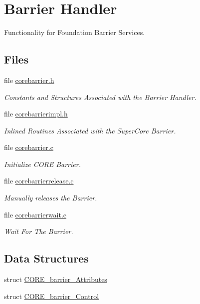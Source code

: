 \hypertarget{group__RTEMSScoreBarrier}{}\section{Barrier Handler}
\label{group__RTEMSScoreBarrier}


Functionality for Foundation Barrier Services.  


\subsection*{Files}
\begin{DoxyCompactItemize}
\item 
file \mbox{\hyperlink{corebarrier_8h}{corebarrier.\+h}}
\begin{DoxyCompactList}\small\item\em Constants and Structures Associated with the Barrier Handler. \end{DoxyCompactList}\item 
file \mbox{\hyperlink{corebarrierimpl_8h}{corebarrierimpl.\+h}}
\begin{DoxyCompactList}\small\item\em Inlined Routines Associated with the Super\+Core Barrier. \end{DoxyCompactList}\item 
file \mbox{\hyperlink{corebarrier_8c}{corebarrier.\+c}}
\begin{DoxyCompactList}\small\item\em Initialize C\+O\+RE Barrier. \end{DoxyCompactList}\item 
file \mbox{\hyperlink{corebarrierrelease_8c}{corebarrierrelease.\+c}}
\begin{DoxyCompactList}\small\item\em Manually releases the Barrier. \end{DoxyCompactList}\item 
file \mbox{\hyperlink{corebarrierwait_8c}{corebarrierwait.\+c}}
\begin{DoxyCompactList}\small\item\em Wait For The Barrier. \end{DoxyCompactList}\end{DoxyCompactItemize}
\subsection*{Data Structures}
\begin{DoxyCompactItemize}
\item 
struct \mbox{\hyperlink{structCORE__barrier__Attributes}{C\+O\+R\+E\+\_\+barrier\+\_\+\+Attributes}}
\item 
struct \mbox{\hyperlink{structCORE__barrier__Control}{C\+O\+R\+E\+\_\+barrier\+\_\+\+Control}}
\end{DoxyCompactItemize}
